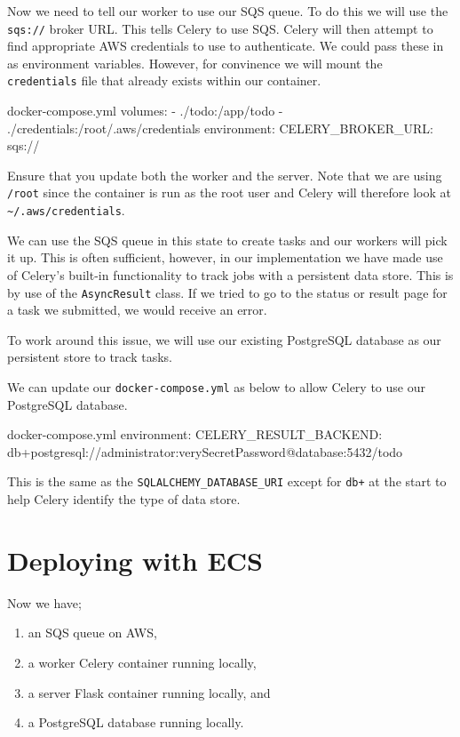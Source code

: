 \documentclass{csse4400}
\begin{document}

Now we need to tell our worker to use our SQS queue.
To do this we will use the \texttt{sqs://} broker URL.
This tells Celery to use SQS.
Celery will then attempt to find appropriate AWS credentials to use to authenticate.
We could pass these in as environment variables.
However, for convinence we will mount the \texttt{credentials} file that already exists within our container.

\begin{code}[numbers=none]{docker-compose.yml}
volumes:
  - ./todo:/app/todo
  - ./credentials:/root/.aws/credentials
environment:
  CELERY_BROKER_URL: sqs://
\end{code}

Ensure that you update both the worker and the server.
Note that we are using \texttt{/root} since the container is run as the root user and Celery will therefore look at \texttt{\textasciitilde/.aws/credentials}.

We can use the SQS queue in this state to create tasks and our workers will pick it up.
This is often sufficient,
however, in our implementation we have made use of Celery's built-in functionality to track jobs with a persistent data store.
This is by use of the \texttt{AsyncResult} class.
If we tried to go to the status or result page for a task we submitted, we would receive an error.

To work around this issue,
we will use our existing PostgreSQL database as our persistent store to track tasks.

We can update our \texttt{docker-compose.yml} as below to allow Celery to use our PostgreSQL database.

\begin{code}[numbers=none]{docker-compose.yml}
environment:
    CELERY_RESULT_BACKEND: db+postgresql://administrator:verySecretPassword@database:5432/todo
\end{code}

This is the same as the \texttt{SQLALCHEMY\_DATABASE\_URI} except for \texttt{db+} at the start to help Celery identify the type of data store.

\section{Deploying with ECS}

Now we have;
\begin{enumerate}
    \item an SQS queue on AWS,
    \item a worker Celery container running locally,
    \item a server Flask container running locally, and
    \item a PostgreSQL database running locally.
\end{enumerate}
\end{document}
